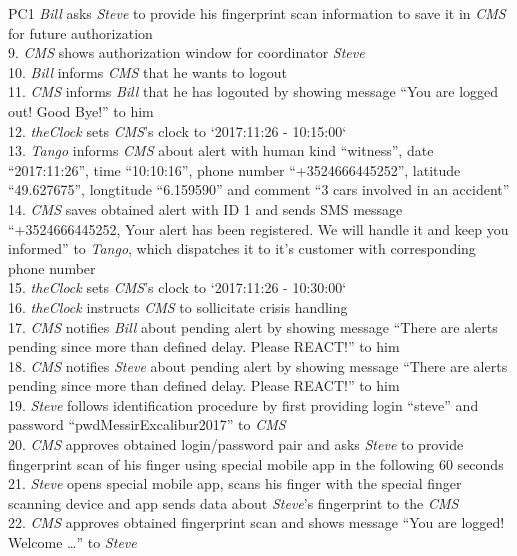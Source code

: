 \begin{lyxlist}{PC1}
{\emph{Bill} asks \emph{Steve} to provide his fingerprint scan information to
save it in \emph{CMS} for future authorization\\
9. \emph{CMS} shows authorization window for coordinator \emph{Steve}\\
10. \emph{Bill} informs \emph{CMS} that he wants to logout\\
11. \emph{CMS} informs \emph{Bill} that he has logouted by showing message ``You
are logged out! Good Bye!'' to him\\
12. \emph{theClock} sets \emph{CMS}'s clock to `2017:11:26 - 10:15:00`\\
13. \emph{Tango} informs \emph{CMS} about alert with human kind ``witness'',
date ``2017:11:26'', time ``10:10:16'', phone number ``+3524666445252'', latitude
``49.627675'', longtitude ``6.159590'' and comment ``3 cars involved in an
accident''\\
14. \emph{CMS} saves obtained alert with ID 1 and sends SMS message
``+3524666445252, Your alert has been registered. We will handle it and keep
you informed'' to \emph{Tango}, which dispatches it to it's customer with
corresponding phone number\\
15. \emph{theClock} sets \emph{CMS}'s clock to `2017:11:26 - 10:30:00`\\
16. \emph{theClock} instructs \emph{CMS} to sollicitate crisis handling\\
17. \emph{CMS} notifies \emph{Bill} about pending alert by showing message
``There are alerts pending since more than defined delay. Please REACT!'' to
him\\
18. \emph{CMS} notifies \emph{Steve} about pending alert by showing message
``There are alerts pending since more than defined delay. Please REACT!'' to
him\\
19. \emph{Steve} follows identification procedure by first providing login
``steve'' and password ``pwdMessirExcalibur2017'' to \emph{CMS}\\
20. \emph{CMS} approves obtained login/password pair and asks
\emph{Steve} to provide fingerprint scan of his finger using special mobile app
in the following 60 seconds\\
21. \emph{Steve} opens special mobile app, scans his finger with the special
finger scanning device and app sends data about \emph{Steve}'s fingerprint to
the \emph{CMS}\\
22. \emph{CMS} approves obtained fingerprint scan and shows message ``You are
logged! Welcome \ldots'' to \emph{Steve}\\
}
\end{lyxlist}

